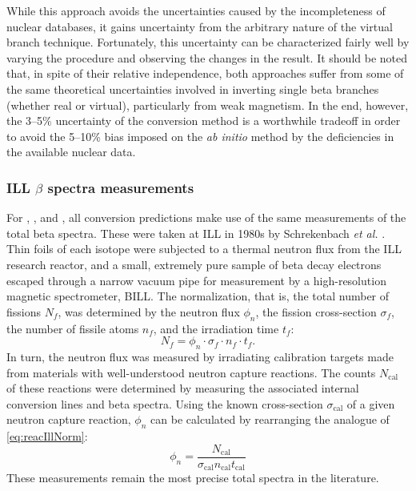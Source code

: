 \documentclass[../thesis.tex]{subfiles}
\begin{document}
While this approach avoids the uncertainties caused by the incompleteness of nuclear databases, it gains uncertainty from the arbitrary nature of the virtual branch technique. Fortunately, this uncertainty can be characterized fairly well by varying the procedure and observing the changes in the result. It should be noted that, in spite of their relative independence, both approaches suffer from some of the same theoretical uncertainties involved in inverting single beta branches (whether real or virtual), particularly from weak magnetism. In the end, however, the 3--5\% uncertainty of the conversion method is a worthwhile tradeoff in order to avoid the 5--10\% bias imposed on the \emph{ab initio} method by the deficiencies in the available nuclear data.

\subsubsection{ILL $\beta$ spectra measurements}
\label{sec:illmeas}

For \urfive, \punine, and \puone, all conversion predictions make use of the same measurements of the total beta spectra. These were taken at ILL in 1980s by Schrekenbach \emph{et al.} \cite{SCHRECKENBACH1981251,VONFEILITZSCH1982162,SCHRECKENBACH1985325,HAHN1989365}. Thin foils of each isotope were subjected to a thermal neutron flux from the ILL research reactor, and a small, extremely pure sample of beta decay electrons escaped through a narrow vacuum pipe for measurement by a high-resolution magnetic spectrometer, BILL.
The normalization, that is, the total number of fissions $N_f$, was determined by the neutron flux $\phi_n$, the fission cross-section $\sigma_f$, the number of fissile atoms $n_f$, and the irradiation time $t_f$:
\begin{equation}
  \label{eq:reacIllNorm}
  N_f = \phi_n \cdot \sigma_f \cdot n_f \cdot t_f.
\end{equation}
In turn, the neutron flux was measured by irradiating calibration targets made from materials with well-understood neutron capture reactions. The counts $N_{\mathrm{cal}}$ of these reactions were determined by measuring the associated internal conversion lines and beta spectra. Using the known cross-section $\sigma_{\mathrm{cal}}$ of a given neutron capture reaction, $\phi_n$ can be calculated by rearranging the analogue of \autoref{eq:reacIllNorm}:
\begin{equation}
  \phi_n = \frac{N_{\mathrm{cal}}}{\sigma_{\mathrm{cal}} n_{\mathrm{cal}} t_{\mathrm{cal}}}
\end{equation}
These measurements remain the most precise total spectra in the literature.
\end{document}
